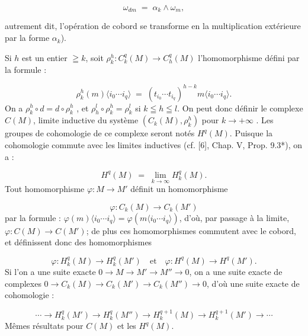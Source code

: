 \begin{equation*}
\omega_{dm} \;=\; \alpha_k \wedge \omega_m ,
\end{equation*}


 autrement dit, l'opération de cobord se transforme en la multiplication extérieure par la forme $\alpha_k$).

Si $h$ est un entier $\geqq k$, soit $\rho^h_k: C^q_k(M) \to C^q_h(M)$ l'homomorphisme défini par la formule :

\begin{equation*}
\rho^h_k(m)\langle i_0 \cdots i_q \rangle \;=\; (t_{i_0} \cdots t_{i_q})^{h-k} m\langle i_0 \cdots i_q \rangle.
\end{equation*}
On a $\rho^h_k \circ d = d \circ \rho^h_k$ , et $\rho^l_h \circ \rho^h_k = \rho^l_k$ si $k \leqq h \leqq l$. On peut donc définir le complexe $C(M)$, limite inductive du système $(C_k(M), \rho^h_k)$ pour $k \to +\infty$ . Les groupes de cohomologie de ce complexe seront notés $H^q(M)$. Puisque la cohomologie commute avec les limites inductives (cf. [6], Chap. V, Prop. 9.3*), on a :

\begin{equation*}
H^q(M) \;=\; \lim_{k \to \infty} H^q_k(M).
\end{equation*}
Tout homomorphisme $\varphi: M \to M'$ définit un homomorphisme

\begin{equation*}
\varphi: C_k(M) \to C_k(M')
\end{equation*}
par la formule : $\varphi(m)\langle i_0 \cdots i_q \rangle = \varphi(m\langle i_0 \cdots i_q \rangle)$, d'où, par passage à la limite, $\varphi: C(M) \to C(M')$; de plus ces homomorphismes commutent avec le cobord, et définissent donc des homomorphismes

\begin{equation*}
\varphi: H^q_k(M) \to H^q_k(M') \quad \mathrm{et} \quad \varphi: H^q(M) \to H^q(M').
\end{equation*}
Si l'on a une suite exacte $0 \to M \to M' \to M'' \to 0$, on a une suite exacte de complexes $0 \to C_k(M) \to C_k(M') \to C_k(M'') \to 0$, d'où une suite exacte de cohomologie :

\begin{equation*}
\cdots \to H^q_k(M') \to H^q_k(M'') \to H^{q+1}_k(M) \to H^{q+1}_k(M') \to \cdots
\end{equation*}
Mêmes résultats pour $C(M)$ et les $H^q(M)$.

